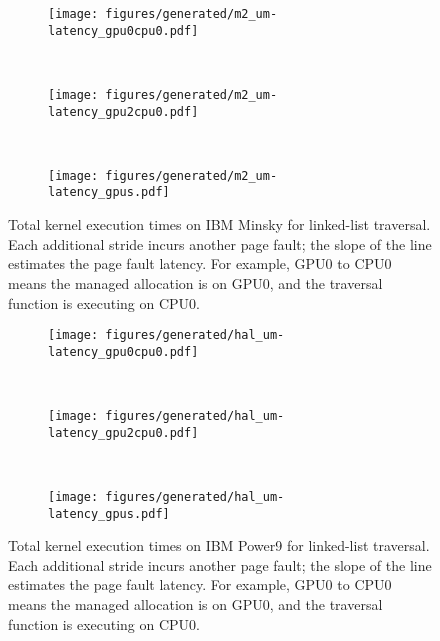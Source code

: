 \begin{figure}[ht]
    \centering
    \begin{subfigure}[b]{0.3\textwidth}
        \texttt{[image: figures/generated/m2\_um-latency\_gpu0cpu0.pdf]}
        \caption{}
        \label{}
    \end{subfigure}
    ~
    \begin{subfigure}[b]{0.3\textwidth}
        \texttt{[image: figures/generated/m2\_um-latency\_gpu2cpu0.pdf]}
        \caption{}
        \label{}
    \end{subfigure}
    ~
    \begin{subfigure}[b]{0.3\textwidth}
        \texttt{[image: figures/generated/m2\_um-latency\_gpus.pdf]}
        \caption{}
        \label{}
    \end{subfigure}
    \caption[]{ 
        Total kernel execution times on IBM Minsky for linked-list traversal.
        Each additional stride incurs another page fault; the slope of the line estimates the page fault latency.
        For example, GPU0 to CPU0 means the managed allocation is on GPU0, and the traversal function is executing on CPU0.
    }
    \label{fig:minsky-page-fault-latency}
\end{figure}


\begin{figure}[ht]
    \centering
    \begin{subfigure}[b]{0.3\textwidth}
        \texttt{[image: figures/generated/hal\_um-latency\_gpu0cpu0.pdf]}
        \caption{}
        \label{}
    \end{subfigure}
    ~
    \begin{subfigure}[b]{0.3\textwidth}
        \texttt{[image: figures/generated/hal\_um-latency\_gpu2cpu0.pdf]}
        \caption{}
        \label{}
    \end{subfigure}
    ~
    \begin{subfigure}[b]{0.3\textwidth}
        \texttt{[image: figures/generated/hal\_um-latency\_gpus.pdf]}
        \caption{}
        \label{}
    \end{subfigure}
    \caption[]{
        Total kernel execution times on IBM Power9 for linked-list traversal.
        Each additional stride incurs another page fault; the slope of the line estimates the page fault latency.
        For example, GPU0 to CPU0 means the managed allocation is on GPU0, and the traversal function is executing on CPU0.
        }
    \label{fig:hal-page-fault-latency}
\end{figure}

